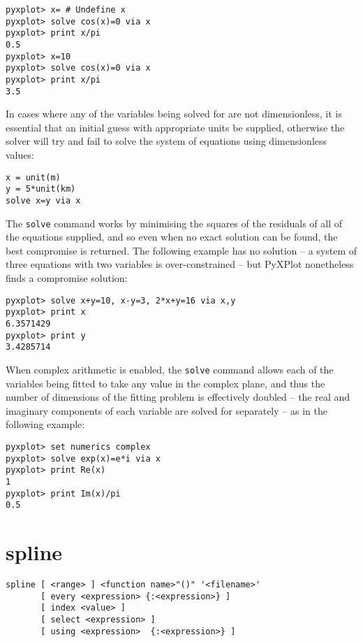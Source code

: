 \begin{verbatim}
pyxplot> x= # Undefine x
pyxplot> solve cos(x)=0 via x
pyxplot> print x/pi
0.5
pyxplot> x=10
pyxplot> solve cos(x)=0 via x
pyxplot> print x/pi
3.5
\end{verbatim}

\noindent In cases where any of the variables being solved for are not
dimensionless, it is essential that an initial guess with appropriate units be
supplied, otherwise the solver will try and fail to solve the system of
equations using dimensionless values:

\begin{verbatim}
x = unit(m)
y = 5*unit(km)
solve x=y via x
\end{verbatim}

The {\tt solve} command works by minimising the squares of the residuals of all
of the equations supplied, and so even when no exact solution can be found, the
best compromise is returned. The following example has no solution -- a system
of three equations with two variables is over-constrained -- but PyXPlot
nonetheless finds a compromise solution:

\begin{verbatim}
pyxplot> solve x+y=10, x-y=3, 2*x+y=16 via x,y
pyxplot> print x
6.3571429
pyxplot> print y
3.4285714
\end{verbatim}

When complex arithmetic is enabled, the {\tt solve} command allows each of the
variables being fitted to take any value in the complex plane, and thus the
number of dimensions of the fitting problem is effectively doubled -- the real
and imaginary components of each variable are solved for separately -- as in
the following example:

\begin{verbatim}
pyxplot> set numerics complex
pyxplot> solve exp(x)=e*i via x
pyxplot> print Re(x)
1
pyxplot> print Im(x)/pi
0.5
\end{verbatim}


\section{spline}

\begin{verbatim}
spline [ <range> ] <function name>"()" '<filename>'
       [ every <expression> {:<expression>} ]
       [ index <value> ]
       [ select <expression> ]
       [ using <expression>  {:<expression>} ]
\end{verbatim}

